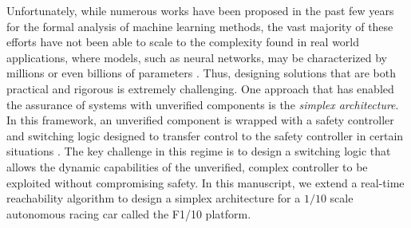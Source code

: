 \documentclass[manuscript,screen,review]{acmart}
\newcommand{\diego}[1]{\textcolor{purple}{\textbf{\underline{DM:}} #1}}
\begin{document}



Unfortunately, while numerous works have been proposed in the past few years for the formal analysis of machine learning methods, the vast majority of these efforts have not been able to scale to the complexity found in real world applications, where models, such as neural networks, may be characterized by millions or even billions of parameters \cite{BallesterGoogLeNet,SimonyanVeryDeep}. Thus, designing solutions that are both practical and rigorous is extremely challenging. One approach that has enabled the assurance of systems with unverified components is the \textit{simplex architecture}. In this framework, an unverified component is wrapped with a safety controller and switching logic designed to transfer control to the safety controller in certain situations \cite{Bak2014}. The key challenge in this regime is to design a switching logic that allows the dynamic capabilities of the unverified, complex controller to be exploited without compromising safety. In this manuscript, we extend a real-time reachability algorithm \cite{Bak2014,Johnson2016} to design a simplex architecture for a $1/10$ scale autonomous racing car called the F1/10 platform. %
\end{document}
